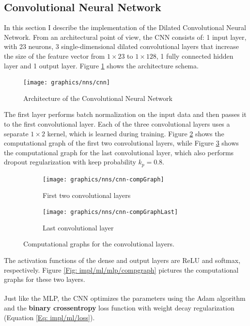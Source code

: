 	\subsection{Convolutional Neural Network} \label{Section: impl/ml/cnn}
	In this section I describe the implementation of the Dilated Convolutional Neural Network. From an architectural point of view, the CNN consists of: 1 input layer, with 23 neurons, 3 single-dimensional dilated convolutional layers that increase the size of the feature vector from $1\times23$ to $1\times128$, 1 fully connected hidden layer and 1 output layer. Figure \ref{Fig: impl/ml/cnn/architecture} shows the architecture schema. 
	\begin{figure}[H]
		\centering
		\texttt{[image: graphics/nns/cnn]}
		\caption{Architecture of the Convolutional Neural Network}
		\label{Fig: impl/ml/cnn/architecture}
	\end{figure}
	The first layer performs batch normalization on the input data and then passes it to the first convolutional layer. Each of the three convolutional layers uses a separate $1\times2$ kernel, which is learned during training. Figure \ref{Fig: impl/ml/cnn/compGraph} shows the computational graph of the first two convolutional layers, while Figure \ref{Fig: impl/ml/cnn/compGraphLast} shows the computational graph for the last convolutional layer, which also performs dropout regularization with keep probability $k_p = 0.8$.
	\begin{figure}[H]
		\centering
		\begin{subfigure}[b]{.4\textwidth}
			\centering
			\texttt{[image: graphics/nns/cnn-compGraph]}
			\caption{First two convolutional layers}
			\label{Fig: impl/ml/cnn/compGraph}
		\end{subfigure}
		\hfill
		\begin{subfigure}[b]{.4\textwidth}
			\centering
			\texttt{[image: graphics/nns/cnn-compGraphLast]}
			\caption{Last convolutional layer}
			\label{Fig: impl/ml/cnn/compGraphLast}
		\end{subfigure}
		\caption{Computational graphs for the convolutional layers.}
		\label{Fig: impl/ml/cnn/compGraphs}
	\end{figure}
	The activation functions of the dense and output layers are ReLU and softmax, respectively. Figure \ref{Fig: impl/ml/mlp/compgraph} pictures the computational graphs for these two layers. 
	\\ \\
	Just like the MLP, the CNN optimizes the parameters using the Adam algorithm and the \textbf{binary crossentropy} loss function with weight decay regularization (Equation \ref{Eq: impl/ml/loss}).
 
